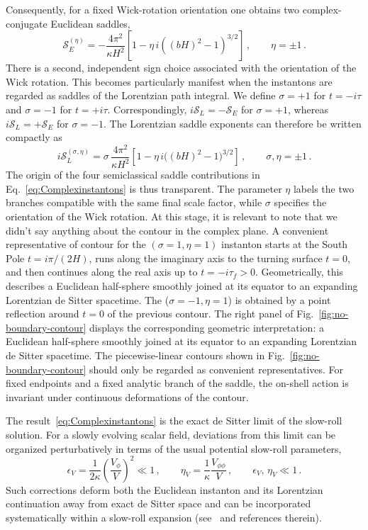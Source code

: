 \documentclass[a4paper,11pt]{article}
\begin{document}
Consequently, for a fixed Wick-rotation orientation one obtains two complex-conjugate Euclidean saddles,
\begin{equation}
    \mathcal{S}_E^{(\eta)}
    =-\frac{4\pi^2}{\kappa H^2}
    \left[
        1-\eta\,i\left((bH)^2-1\right)^{3/2}
    \right]\,,
    \qquad \eta=\pm1\,.
\end{equation}
There is a second, independent sign choice associated with the orientation of the Wick rotation. This becomes particularly manifest when the instantons are regarded as saddles of the Lorentzian path integral. We define
$\sigma=+1$ for $t=-i\tau$ and
$\sigma=-1$ for $t=+i\tau$. Correspondingly,
$i\mathcal{S}_L=-\mathcal{S}_E$ for $\sigma=+1$, whereas
$i\mathcal{S}_L=+\mathcal{S}_E$ for $\sigma=-1$. The Lorentzian saddle exponents can therefore be written compactly as
\begin{equation}\label{eq:Complexinstantons}
    i\mathcal{S}_L^{(\sigma,\eta)}
    =\sigma\,\frac{4\pi^2}{\kappa H^2}
    \left[
        1-\eta\,i\big((bH)^2-1\big)^{3/2}
    \right]\,,
    \qquad \sigma,\eta=\pm1\,.
\end{equation}
The origin of the four semiclassical saddle contributions in
Eq.~\eqref{eq:Complexinstantons} is thus transparent.  The parameter
$\eta$ labels the two branches compatible with the same final scale factor, while $\sigma$ specifies the orientation of the Wick rotation.
At this stage, it is relevant to note that we didn't say anything about the contour in the complex plane. A convenient representative of contour for the $(\sigma =1, \eta =1)$ instanton starts at the South Pole $t=i\pi/(2H)$, runs along the imaginary axis to the turning surface $t=0$, and then continues along the real axis up to $t=-i\tau_f>0$. Geometrically, this describes a Euclidean half-sphere smoothly joined at its equator to an expanding Lorentzian de Sitter spacetime. The ($\sigma=-1,\eta=1$) is obtained by a point reflection around $t=0$ of the previous contour. The right panel of Fig.~\ref{fig:no-boundary-contour} displays the corresponding geometric interpretation: a Euclidean half-sphere smoothly joined at its equator to an expanding Lorentzian de Sitter spacetime. The piecewise-linear contours shown in Fig.~\ref{fig:no-boundary-contour} should only be regarded as convenient
representatives. For fixed endpoints and a fixed analytic branch of the saddle, the on-shell action is invariant under continuous deformations of the contour.
 
The result~\eqref{eq:Complexinstantons} is the exact de Sitter limit of the slow-roll solution. For a
slowly evolving scalar field, deviations from this limit can be organized perturbatively in terms of the usual potential slow-roll parameters,
\begin{equation}
    \epsilon_V = \frac{1}{2 \kappa} \left(\frac{V_{\phi}}{V}\right)^2\ll1\,,\qquad \eta_V = \frac{1}{ \kappa} \frac{V_{\phi \phi}}{V}\,, \qquad \epsilon_V,\,\eta_V \ll 1\,.
\label{eq:slow_roll}
\end{equation}
Such corrections deform both the Euclidean instanton and its Lorentzian continuation away from exact de Sitter space and can be incorporated systematically within a slow-roll expansion (see~\cite{Maldacena:2024uhs,Janssen_2021} and references therein).
\end{document}
